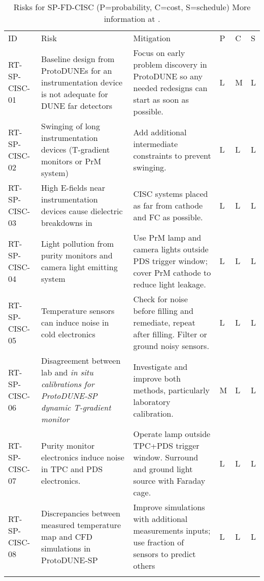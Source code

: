 
\begin{footnotesize}
\begin{longtable}{x{0.18\textwidth}x{0.20\textwidth}x{0.32\textwidth}x{0.02\textwidth}x{0.02\textwidth}x{0.02\textwidth}} 
\caption[Risks for SP-FD-CISC]{Risks for SP-FD-CISC (P=probability, C=cost, S=schedule) More information at . } \\
ID & Risk & Mitigation & P & C & S  \\  \colhline
RT-SP-CISC-01 & Baseline design from ProtoDUNEs for an instrumentation device is not adequate for DUNE far detectors & Focus on early problem discovery in ProtoDUNE so any needed redesigns can start as soon as possible. & L & M & L \\  \colhline
RT-SP-CISC-02 & Swinging of long instrumentation devices (T-gradient monitors or PrM system) & Add additional intermediate constraints to prevent swinging. & L & L & L \\  \colhline
RT-SP-CISC-03 & High E-fields near instrumentation devices cause dielectric breakdowns in  & CISC systems placed as far from cathode and FC as possible. & L & L & L \\  \colhline
RT-SP-CISC-04 & Light pollution from purity monitors and camera light emitting system & Use PrM lamp and camera lights outside PDS trigger window; cover PrM cathode to reduce light leakage. & L & L & L \\  \colhline
RT-SP-CISC-05 & Temperature sensors can induce noise in cold electronics & Check for noise before filling and remediate, repeat after filling. Filter or ground noisy sensors. & L & L  & L \\  \colhline
RT-SP-CISC-06 & Disagreement between lab and \em{in situ} calibrations for ProtoDUNE-SP dynamic T-gradient monitor & Investigate and improve both methods, particularly laboratory calibration. & M & L & L \\  \colhline
RT-SP-CISC-07 & Purity monitor electronics induce noise in TPC and PDS electronics. & Operate lamp outside TPC+PDS trigger window. Surround and ground light source with Faraday cage. & L & L & L \\  \colhline
RT-SP-CISC-08 & Discrepancies between measured temperature map and CFD simulations in ProtoDUNE-SP & Improve simulations with additional measurements inputs; use fraction of sensors to predict others   & L & L & L \\  \colhline

\end{longtable}
\end{footnotesize}
